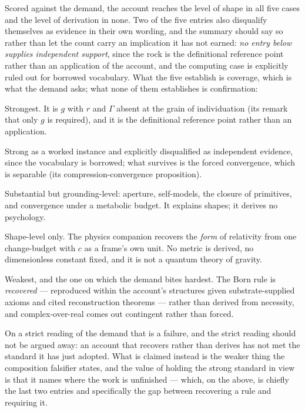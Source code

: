 \documentclass[11pt,a4paper]{article}
\theoremstyle{remark}\newtheorem{remark}[definition]{Remark}
\begin{document}
Scored against the demand, the account reaches the level of shape in all five cases and the level of
derivation in none. Two of the five entries also disqualify themselves as evidence in their own
wording, and the summary should say so rather than let the count carry an implication it has not
earned: \emph{no entry below supplies independent support}, since the rock is the definitional
reference point rather than an application of the account, and the computing case is explicitly
ruled out for borrowed vocabulary. What the five establish is coverage, which is what the demand
asks; what none of them establishes is confirmation:

\begin{description}[leftmargin=*,style=nextline]
\item[Rock.] Strongest. It is $g$ with $r$ and $\Gamma$ absent at the grain of individuation
(its remark that only $g$ is required), and it is the definitional reference point rather than an application.
\item[Computers.] Strong as a worked instance and explicitly disqualified as independent evidence,
since the vocabulary is borrowed; what survives is the forced convergence, which is separable
(its compression-convergence proposition).
\item[Cognition.] Substantial but grounding-level: aperture, self-models, the closure of primitives,
and convergence under a metabolic budget. It explains shapes; it derives no psychology.
\item[Observable universe.] Shape-level only. The physics companion recovers the \emph{form} of
relativity from one change-budget with $c$ as a frame's own unit. No metric is derived, no
dimensionless constant fixed, and it is not a quantum theory of gravity.
\item[Quantum physics.] Weakest, and the one on which the demand bites hardest. The Born rule is
\emph{recovered} --- reproduced within the account's structures given substrate-supplied axioms and
cited reconstruction theorems --- rather than derived from necessity, and complex-over-real comes out
contingent rather than forced.
\end{description}

On a strict reading of the demand that is a failure, and the strict reading should not be argued
away: an account that recovers rather than derives has not met the standard it has just adopted.
What is claimed instead is the weaker thing the composition falsifier states, and the value of
holding the strong standard in view is that it names where the work is unfinished --- which, on the
above, is chiefly the last two entries and specifically the gap between recovering a rule and
requiring it.
\end{document}
